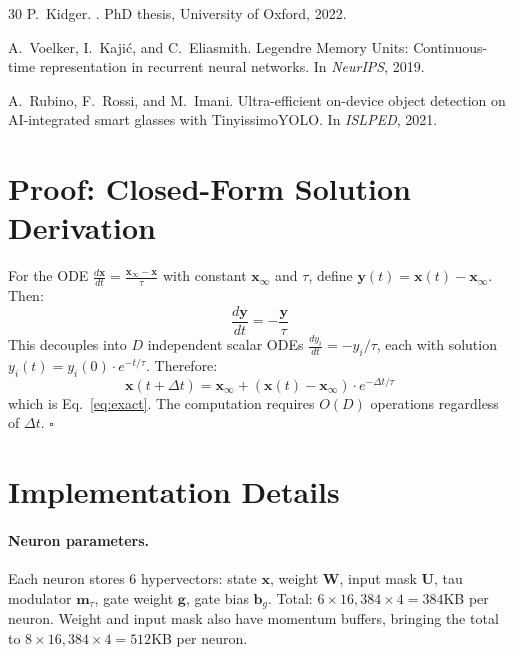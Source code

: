 \documentclass{article}
\newcommand{\hvx}{\mathbf{x}}
\newcommand{\hvw}{\mathbf{W}}
\newcommand{\hvu}{\mathbf{U}}
\newcommand{\xinf}{\mathbf{x}_\infty}
\begin{document}
\begin{thebibliography}{30}
P.~Kidger.
.
\newblock PhD thesis, University of Oxford, 2022.

A.~Voelker, I.~Kaji{\'c}, and C.~Eliasmith.
\newblock Legendre Memory Units: Continuous-time representation in recurrent neural networks.
\newblock In {\em NeurIPS}, 2019.

A.~Rubino, F.~Rossi, and M.~Imani.
\newblock Ultra-efficient on-device object detection on AI-integrated smart glasses with TinyissimoYOLO.
\newblock In {\em ISLPED}, 2021.

\end{thebibliography}


\appendix

\section{Proof: Closed-Form Solution Derivation}
\label{app:proof}

For the ODE $\frac{d\hvx}{dt} = \frac{\xinf - \hvx}{\tau}$ with constant $\xinf$ and $\tau$, define $\mathbf{y}(t) = \hvx(t) - \xinf$. Then:
\begin{equation}
    \frac{d\mathbf{y}}{dt} = -\frac{\mathbf{y}}{\tau}
\end{equation}
This decouples into $D$ independent scalar ODEs $\frac{dy_i}{dt} = -y_i / \tau$, each with solution $y_i(t) = y_i(0) \cdot e^{-t/\tau}$. Therefore:
\begin{equation}
    \hvx(t + \Delta t) = \xinf + (\hvx(t) - \xinf) \cdot e^{-\Delta t / \tau}
\end{equation}
which is Eq.~\ref{eq:exact}. The computation requires $O(D)$ operations regardless of $\Delta t$. \hfill $\square$

\section{Implementation Details}
\label{app:implementation}

\paragraph{Neuron parameters.} Each neuron stores 6 hypervectors: state $\hvx$, weight $\hvw$, input mask $\hvu$, tau modulator $\mathbf{m}_\tau$, gate weight $\mathbf{g}$, gate bias $\mathbf{b}_g$. Total: $6 \times 16{,}384 \times 4 = 384$KB per neuron. Weight and input mask also have momentum buffers, bringing the total to $8 \times 16{,}384 \times 4 = 512$KB per neuron.
\end{document}
